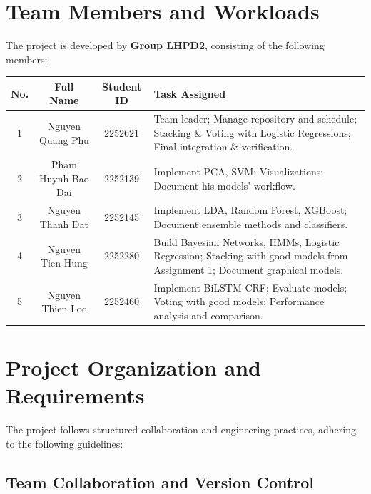 \section{Team Members and Workloads}

The project is developed by \textbf{Group LHPD2}, consisting of the following members:

\begin{center}
    \renewcommand{\arraystretch}{1.5}
    \begin{tabularx}{\textwidth}{||c|c|c|X||}
    \hline
    \textbf{No.} & \textbf{Full Name} & \textbf{Student ID} & \textbf{Task Assigned} \\
    \hline
    1 & Nguyen Quang Phu & 2252621 & Team leader; Manage repository and schedule; Stacking \& Voting with Logistic Regressions; Final integration \& verification. \\
    \hline
    2 & Pham Huynh Bao Dai & 2252139 & Implement PCA, SVM; Visualizations; Document his models' workflow. \\
    \hline
    3 & Nguyen Thanh Dat & 2252145 & Implement LDA, Random Forest, XGBoost; Document ensemble methods and classifiers. \\
    \hline
    4 & Nguyen Tien Hung & 2252280 & Build Bayesian Networks, HMMs, Logistic Regression; Stacking with good models from Assignment 1; Document graphical models. \\
    \hline
    5 & Nguyen Thien Loc & 2252460 & Implement BiLSTM-CRF; Evaluate models; Voting with good models; Performance analysis and comparison. \\
    \hline
    \end{tabularx}
\end{center}

\section{Project Organization and Requirements}

The project follows structured collaboration and engineering practices, adhering to the following guidelines:

\subsection{Team Collaboration and Version Control}

